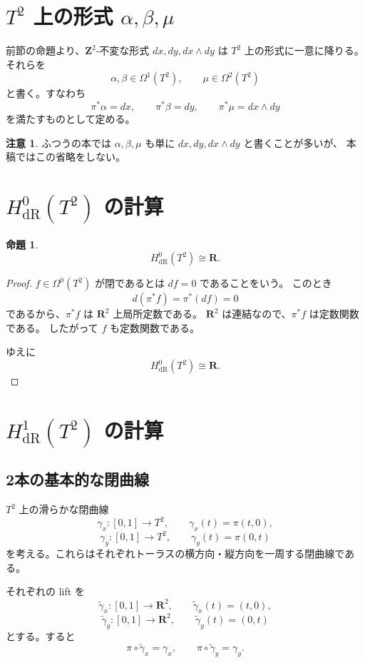 \documentclass[uplatex,dvipdfmx,11pt]{jsarticle}
\newcommand{\R}{\mathbf{R}}
\newcommand{\Z}{\mathbf{Z}}
\theoremstyle{definition}
\newtheorem{prop}{命題}
\newtheorem{remark}{注意}
\begin{document}
\section{\(T^2\) 上の形式 \(\alpha,\beta,\mu\)}

前節の命題より、\(\Z^2\)-不変な形式 \(dx,dy,dx\wedge dy\) は
\(T^2\) 上の形式に一意に降りる。
それらを
\[
\alpha,\beta\in \Omega^1(T^2),\qquad \mu\in \Omega^2(T^2)
\]
と書く。すなわち
\[
\pi^*\alpha=dx,\qquad \pi^*\beta=dy,\qquad \pi^*\mu=dx\wedge dy
\tag{1}
\]
を満たすものとして定める。

\begin{remark}
ふつうの本では \(\alpha,\beta,\mu\) も単に \(dx,dy,dx\wedge dy\) と書くことが多いが、
本稿ではこの省略をしない。
\end{remark}

\section{\(H^0_{\mathrm{dR}}(T^2)\) の計算}

\begin{prop}
\[
H^0_{\mathrm{dR}}(T^2)\cong \R.
\]
\end{prop}

\begin{proof}
\(f\in \Omega^0(T^2)\) が閉であるとは \(df=0\) であることをいう。
このとき
\[
d(\pi^*f)=\pi^*(df)=0
\]
であるから、\(\pi^*f\) は \(\R^2\) 上局所定数である。
\(\R^2\) は連結なので、\(\pi^*f\) は定数関数である。
したがって \(f\) も定数関数である。

ゆえに
\[
H^0_{\mathrm{dR}}(T^2)\cong \R.
\]
\end{proof}

\section{\(H^1_{\mathrm{dR}}(T^2)\) の計算}

\subsection{2本の基本的な閉曲線}

\(T^2\) 上の滑らかな閉曲線
\[
\gamma_x:[0,1]\to T^2,\qquad \gamma_x(t)=\pi(t,0),
\]
\[
\gamma_y:[0,1]\to T^2,\qquad \gamma_y(t)=\pi(0,t)
\]
を考える。これらはそれぞれトーラスの横方向・縦方向を一周する閉曲線である。

それぞれの lift を
\[
\widetilde{\gamma}_x:[0,1]\to \R^2,\qquad \widetilde{\gamma}_x(t)=(t,0),
\]
\[
\widetilde{\gamma}_y:[0,1]\to \R^2,\qquad \widetilde{\gamma}_y(t)=(0,t)
\]
とする。すると
\[
\pi\circ \widetilde{\gamma}_x=\gamma_x,\qquad
\pi\circ \widetilde{\gamma}_y=\gamma_y.
\tag{2}
\]
\end{document}
